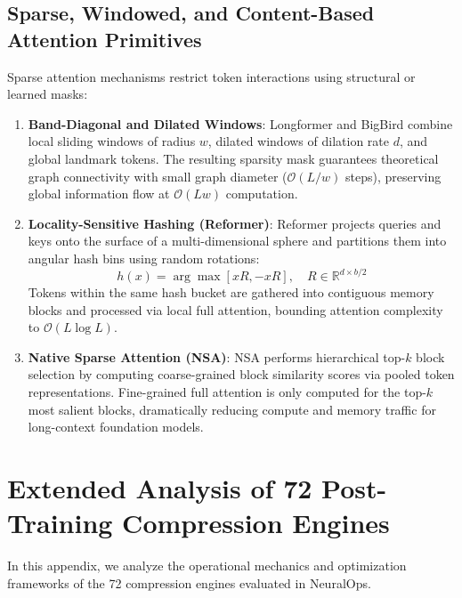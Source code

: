 \documentclass{article}
\begin{document}
\subsection{Sparse, Windowed, and Content-Based Attention Primitives}
Sparse attention mechanisms restrict token interactions using structural or learned masks:
\begin{enumerate}
    \item \textbf{Band-Diagonal and Dilated Windows}:
    Longformer \citep{beltagy2020longformer} and BigBird \citep{zaheer2020bigbird} combine local sliding windows of radius $w$, dilated windows of dilation rate $d$, and global landmark tokens. The resulting sparsity mask guarantees theoretical graph connectivity with small graph diameter ($\mathcal{O}(L / w)$ steps), preserving global information flow at $\mathcal{O}(L w)$ computation.
    \item \textbf{Locality-Sensitive Hashing (Reformer)}:
    Reformer \citep{kitaev2020reformer} projects queries and keys onto the surface of a multi-dimensional sphere and partitions them into angular hash bins using random rotations:
    \begin{equation}
        h(x) = \arg\max [x R, -x R], \quad R \in \mathbb{R}^{d \times b/2}
    \end{equation}
    Tokens within the same hash bucket are gathered into contiguous memory blocks and processed via local full attention, bounding attention complexity to $\mathcal{O}(L \log L)$.
    \item \textbf{Native Sparse Attention (NSA)}:
    NSA \citep{nsa_2024} performs hierarchical top-$k$ block selection by computing coarse-grained block similarity scores via pooled token representations. Fine-grained full attention is only computed for the top-$k$ most salient blocks, dramatically reducing compute and memory traffic for long-context foundation models.
\end{enumerate}

\section{Extended Analysis of 72 Post-Training Compression Engines}
\label{app:extended_compressors}
In this appendix, we analyze the operational mechanics and optimization frameworks of the 72 compression engines evaluated in NeuralOps.
\end{document}
